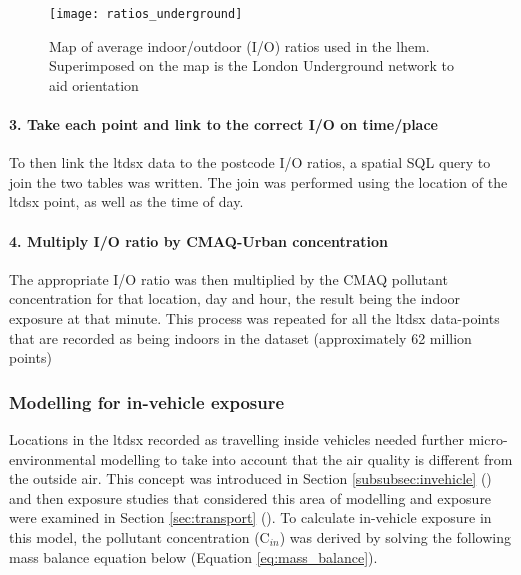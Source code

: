 \begin{figure}[H]
\centering
\texttt{[image: ratios\_underground]}
\caption{Map of average indoor/outdoor (I/O) ratios used in the \gls{lhem}. Superimposed on the map is the London Underground network to aid orientation}
\label{fig:ratios_underground}
\end{figure}

            \paragraph{3. Take each point and link to the correct I/O on time/place}
            \label{sec:linking_points_to_postcode_ratios}

To then link the \gls{ltdsx} data to the postcode I/O ratios, a spatial SQL query to join the two tables was written. The join was performed using the location of the \gls{ltdsx} point, as well as the time of day.

            \paragraph{4. Multiply I/O ratio by CMAQ-Urban concentration}
            \label{sec:multiple_io_by_cmaq}

The appropriate I/O ratio was then multiplied by the CMAQ pollutant concentration for that location, day and hour, the result being the indoor exposure at that minute. This process was repeated for all the \gls{ltdsx} data-points that are recorded as being indoors in the dataset (approximately 62 million points)

\subsubsection{Modelling for in-vehicle exposure}
\label{sec:in_vehicle_modelling}

Locations in the \gls{ltdsx} recorded as travelling inside vehicles needed further micro-environmental modelling to take into account that the air quality is different from the outside air. This concept was introduced in Section \ref{subsubsec:invehicle} () and then exposure studies that considered this area of modelling and exposure were examined in Section \ref{sec:transport} (). To calculate in-vehicle exposure in this model, the pollutant concentration (C$_{in}$) was derived by solving the following mass balance equation below (Equation \ref{eq:mass_balance}).

